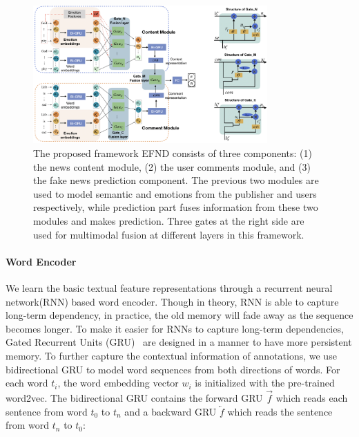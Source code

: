 \documentclass[conference]{IEEEtran}
\newcommand{\m}{EFND}
\begin{document}
	\begin{figure}[t]
		\centering
		\includegraphics[width=0.8\textwidth]{./Figure/framework.png}
		\caption{The proposed framework {\m} consists of three components: (1) the news content module, (2) the user comments module, and (3) the fake news prediction component. The previous two modules are used to model semantic and emotions from the publisher and users respectively, while prediction part fuses information from these two modules and makes prediction. Three gates at the right side are used for multimodal fusion at different layers in this framework.}
		\label{Fig:framework}
	\end{figure}
	\paragraph{Word Encoder}
	We learn the basic textual feature representations through a recurrent neural network(RNN) based word encoder. Though in theory, RNN is able to capture long-term dependency, in practice, the old memory will fade away as the sequence becomes longer. To make it easier for RNNs to capture long-term dependencies,
	Gated Recurrent Units (GRU)~\cite{bahdanau2014neural} are designed in a manner to have more persistent memory. To further capture the contextual information of annotations, we use bidirectional GRU to model word sequences
	from both directions of words. For each word $t_i$, the word embedding vector $w_i$ is initialized with the pre-trained word2vec\cite{mikolov2013distributed}. The bidirectional GRU contains the forward GRU $\overrightarrow{f}$ which reads each sentence from word $t_0$ to $t_n$ and a backward GRU $\overleftarrow{f}$ which reads the sentence from word $t_n$ to $t_0$:
	
\end{document}
